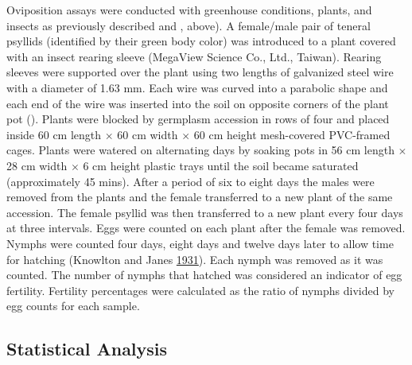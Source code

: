 \documentclass[]{article}
\begin{document}
Oviposition assays were conducted with greenhouse conditions, plants,
and insects as previously described and , above). A female/male pair of
teneral psyllids (identified by their green body color) was introduced
to a plant covered with an insect rearing sleeve (MegaView Science Co.,
Ltd., Taiwan). Rearing sleeves were supported over the plant using two
lengths of galvanized steel wire with a diameter of 1.63 mm. Each wire
was curved into a parabolic shape and each end of the wire was inserted
into the soil on opposite corners of the plant pot (). Plants were
blocked by germplasm accession in rows of four and placed inside 60 cm
length \(\times\) 60 cm width \(\times\) 60 cm height mesh-covered
PVC-framed cages. Plants were watered on alternating days by soaking
pots in 56 cm length \(\times\) 28 cm width \(\times\) 6 cm height
plastic trays until the soil became saturated (approximately 45 mins).
After a period of six to eight days the males were removed from the
plants and the female transferred to a new plant of the same accession.
The female psyllid was then transferred to a new plant every four days
at three intervals. Eggs were counted on each plant after the female was
removed. Nymphs were counted four days, eight days and twelve days later
to allow time for hatching (Knowlton and Janes
\protect\hyperlink{ref-Knowlton1931}{1931}). Each nymph was removed as
it was counted. The number of nymphs that hatched was considered an
indicator of egg fertility. Fertility percentages were calculated as the
ratio of nymphs divided by egg counts for each sample.

\hypertarget{sec:stats}{%
\subsection{Statistical Analysis}\label{sec:stats}}
\end{document}
